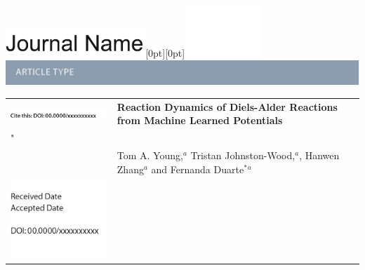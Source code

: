 \documentclass[twoside,twocolumn,9pt]{article}
\begin{document}
  \begin{@twocolumnfalse}
{\includegraphics[height=30pt]{head_foot/journal_name}\hfill\raisebox{0pt}[0pt][0pt]{\includegraphics[height=55pt]{head_foot/RSC_LOGO_CMYK}}\\[1ex]
\includegraphics[width=18.5cm]{head_foot/header_bar}}\par
\vspace{1em}
\sffamily
\begin{tabular}{m{4.5cm} p{13.5cm} }

\includegraphics{head_foot/DOI} & \noindent\LARGE{\textbf{Reaction Dynamics of Diels-Alder Reactions from Machine Learned Potentials}} \\%
"
 & \vspace{0.3cm} \\

 & \noindent\large{Tom A. Young,\textit{$^{a}$} Tristan Johnston-Wood,\textit{$^{a}$}, Hanwen Zhang\textit{$^{a}$} and Fernanda Duarte$^\ast$\textit{$^{a}$}} \\%

\includegraphics{head_foot/dates} & \\

\end{tabular}

 \end{@twocolumnfalse} \vspace{0.6cm}
\end{document}
